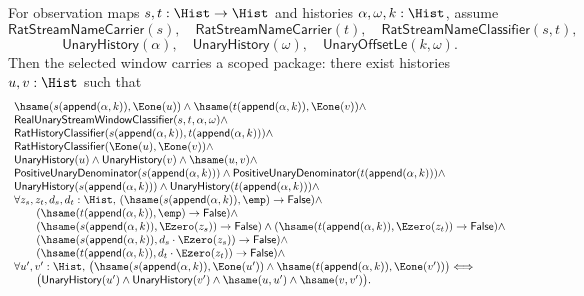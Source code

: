 \begin{theorem}
\label{thm:real-unary-streamname-selected-window-scoped-tail-package}
For observation maps $s,t:\Hist\to\Hist$ and histories
$\alpha,\omega,k:\Hist$, assume
$$
\mathsf{RatStreamNameCarrier}(s),\quad
\mathsf{RatStreamNameCarrier}(t),\quad
\mathsf{RatStreamNameClassifier}(s,t),
$$
$$
\mathsf{UnaryHistory}(\alpha),\quad
\mathsf{UnaryHistory}(\omega),\quad
\mathsf{UnaryOffsetLe}(k,\omega).
$$
Then the selected window carries a scoped package: there exist histories
$u,v:\Hist$ such that
$$
\begin{array}{l}
\hsame(s(\mathsf{append}(\alpha,k)),\Eone(u))\land
\hsame(t(\mathsf{append}(\alpha,k)),\Eone(v))\land\\
\mathsf{RealUnaryStreamWindowClassifier}(s,t,\alpha,\omega)\land\\
\mathsf{RatHistoryClassifier}(s(\mathsf{append}(\alpha,k)),t(\mathsf{append}(\alpha,k)))\land\\
\mathsf{RatHistoryClassifier}(\Eone(u),\Eone(v))\land\\
\mathsf{UnaryHistory}(u)\land
\mathsf{UnaryHistory}(v)\land
\hsame(u,v)\land\\
\mathsf{PositiveUnaryDenominator}(s(\mathsf{append}(\alpha,k)))\land
\mathsf{PositiveUnaryDenominator}(t(\mathsf{append}(\alpha,k)))\land\\
\mathsf{UnaryHistory}(s(\mathsf{append}(\alpha,k)))\land
\mathsf{UnaryHistory}(t(\mathsf{append}(\alpha,k)))\land\\
\forall z_s,z_t,d_s,d_t:\Hist,\,
(\hsame(s(\mathsf{append}(\alpha,k)),\emp)\to\mathsf{False})\land\\
\qquad
(\hsame(t(\mathsf{append}(\alpha,k)),\emp)\to\mathsf{False})\land\\
\qquad
(\hsame(s(\mathsf{append}(\alpha,k)),\Ezero(z_s))\to\mathsf{False})\land
(\hsame(t(\mathsf{append}(\alpha,k)),\Ezero(z_t))\to\mathsf{False})\land\\
\qquad
(\hsame(s(\mathsf{append}(\alpha,k)),d_s\cdot\Ezero(z_s))\to
\mathsf{False})\land\\
\qquad
(\hsame(t(\mathsf{append}(\alpha,k)),d_t\cdot\Ezero(z_t))\to
\mathsf{False})\land\\
\forall u',v':\Hist,\,
\bigl(\hsame(s(\mathsf{append}(\alpha,k)),\Eone(u'))\land
\hsame(t(\mathsf{append}(\alpha,k)),\Eone(v'))\bigr)
\Longleftrightarrow\\
\qquad
\bigl(\mathsf{UnaryHistory}(u')\land
\mathsf{UnaryHistory}(v')\land
\hsame(u,u')\land
\hsame(v,v')\bigr).
\end{array}
$$
\end{theorem}
